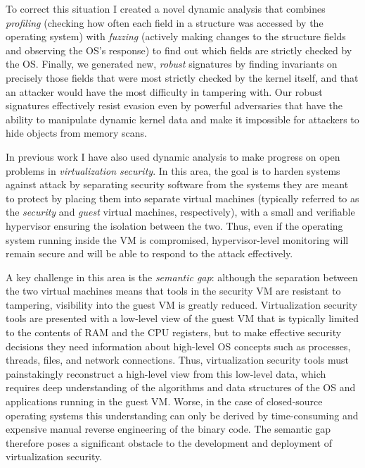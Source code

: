 \documentclass{article}
\begin{document}
To correct this situation I created a novel dynamic analysis that
combines \emph{profiling} (checking how often each field in a structure
was accessed by the operating system) with \emph{fuzzing} (actively
making changes to the structure fields and observing the OS's response)
to find out which fields are strictly checked by the OS. Finally, we
generated new, \emph{robust} signatures by finding invariants on
precisely those fields that were most strictly checked by the kernel
itself, and that an attacker would have the most difficulty in tampering
with. Our robust signatures effectively resist evasion even by powerful
adversaries that have the ability to manipulate dynamic kernel data and
make it impossible for attackers to hide objects from memory scans.

In previous work I have also used dynamic analysis to make progress on
open problems in \emph{virtualization security}. In this area, the goal
is to harden systems against attack by separating security software from
the systems they are meant to protect by placing them into separate
virtual machines (typically referred to as the \emph{security} and
\emph{guest} virtual machines, respectively), with a small and
verifiable hypervisor ensuring the isolation between the two. Thus, even
if the operating system running inside the VM is compromised,
hypervisor-level monitoring will remain secure and will be able to
respond to the attack effectively.

A key challenge in this area is the \emph{semantic gap}: although the
separation between the two virtual machines means that tools in the
security VM are resistant to tampering, visibility into the guest VM is
greatly reduced. Virtualization security tools are presented with a
low-level view of the guest VM that is typically limited to the contents
of RAM and the CPU registers, but to make effective security decisions
they need information about high-level OS concepts such as processes,
threads, files, and network connections.  Thus, virtualization security
tools must painstakingly reconstruct a high-level view from this
low-level data, which requires deep understanding of the algorithms and
data structures of the OS and applications running in the guest VM.
Worse, in the case of closed-source operating systems this understanding
can only be derived by time-consuming and expensive manual reverse
engineering of the binary code. The semantic gap therefore poses a
significant obstacle to the development and deployment of virtualization
security.
\end{document}
